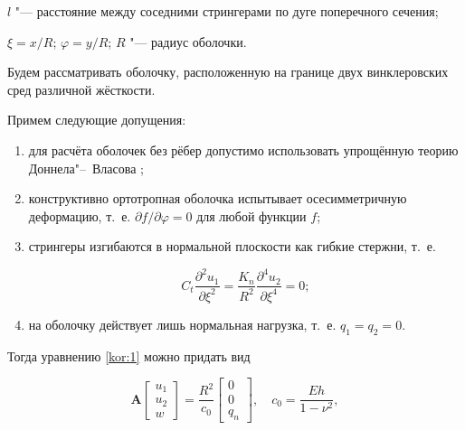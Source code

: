 $l$ "--- расстояние между соседними стрингерами по дуге поперечного сечения; 

$\xi=x/R$; $\varphi=y/R$; $R$ "--- радиус оболочки.



Будем рассматривать оболочку, расположенную на границе двух винклеровских сред различной жёсткости.

Примем следующие допущения:



\begin{enumerate}

\item[i)] для расчёта оболочек без рёбер допустимо использовать упрощённую теорию Доннела"--~Власова \cite[табл. 13.2, форм. (13.18с)]{kor:bib:3};



\item[ii)] конструктивно ортотропная оболочка испытывает осесимметричную деформацию, т.~е. $ \partial f/\partial\varphi=0$ для любой функции $f$;



\item[iii)] стрингеры изгибаются в нормальной плоскости как гибкие стержни, т.~е.

$$

C_t\frac{\partial^2u_1}{\partial\xi^2}=\frac{K_n}{R^2}\frac{\partial^4 u_2}{\partial\xi^4}=0;

$$



\item[iv)] на оболочку действует лишь нормальная нагрузка, т.~е. $q_1=q_2=0$.

\end{enumerate}



Тогда уравнению \eqref{kor:1} можно придать вид

\begin{equation}

\textbf{A}\begin{bmatrix} u_1 \\ u_2 \\ w \end{bmatrix} = \frac{R^2}{c_0}\begin{bmatrix} 0 \\ 0 \\ q_n \end{bmatrix},\quad   c_0 = \frac{Eh}{1-\nu^2},

\label{kor:2}

\end{equation}

